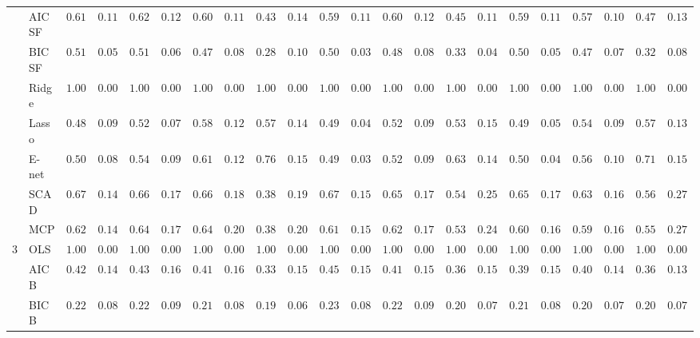 \begin{tabular}{ll|ll|llllll|llllll|llllll}
 & AIC SF  & $0.6183$ & $0.1143$ & $0.6217$ & $0.1250$ & $0.6067$ & $0.1197$ & $0.4367$ & $0.1494$ & $0.5917$ & $0.1145$ & $0.6067$ & $0.1265$ & $0.4500$ & $0.1173$ & $0.5983$ & $0.1138$ & $0.5700$ & $0.1064$ & $0.4700$ & $0.1327$ \\
 & BIC SF  & $0.5100$ & $0.0520$ & $0.5100$ & $0.0619$ & $0.4700$ & $0.0834$ & $0.2833$ & $0.1019$ & $0.5017$ & $0.0374$ & $0.4800$ & $0.0863$ & $0.3350$ & $0.0443$ & $0.5050$ & $0.0500$ & $0.4767$ & $0.0750$ & $0.3200$ & $0.0876$ \\
 & Ridge  & $1.0000$ & $0.0000$ & $1.0000$ & $0.0000$ & $1.0000$ & $0.0000$ & $1.0000$ & $0.0000$ & $1.0000$ & $0.0000$ & $1.0000$ & $0.0000$ & $1.0000$ & $0.0000$ & $1.0000$ & $0.0000$ & $1.0000$ & $0.0000$ & $1.0000$ & $0.0000$ \\
 & Lasso  & $0.4867$ & $0.0967$ & $0.5267$ & $0.0739$ & $0.5833$ & $0.1219$ & $0.5700$ & $0.1425$ & $0.4900$ & $0.0463$ & $0.5217$ & $0.0907$ & $0.5350$ & $0.1522$ & $0.4933$ & $0.0525$ & $0.5433$ & $0.0966$ & $0.5733$ & $0.1347$ \\
 & E-net  & $0.5017$ & $0.0837$ & $0.5467$ & $0.0920$ & $0.6183$ & $0.1238$ & $0.7600$ & $0.1577$ & $0.4983$ & $0.0374$ & $0.5267$ & $0.0939$ & $0.6383$ & $0.1480$ & $0.5000$ & $0.0474$ & $0.5600$ & $0.1099$ & $0.7100$ & $0.1528$ \\
 & SCAD  & $0.6783$ & $0.1484$ & $0.6617$ & $0.1732$ & $0.6667$ & $0.1880$ & $0.3800$ & $0.1955$ & $0.6717$ & $0.1507$ & $0.6583$ & $0.1747$ & $0.5417$ & $0.2577$ & $0.6567$ & $0.1722$ & $0.6350$ & $0.1653$ & $0.5633$ & $0.2770$ \\
 & MCP  & $0.6283$ & $0.1457$ & $0.6450$ & $0.1703$ & $0.6433$ & $0.2024$ & $0.3850$ & $0.2020$ & $0.6150$ & $0.1548$ & $0.6233$ & $0.1767$ & $0.5333$ & $0.2462$ & $0.6067$ & $0.1684$ & $0.5983$ & $0.1693$ & $0.5550$ & $0.2763$ \\\hline
3 & OLS  & $1.0000$ & $0.0000$ & $1.0000$ & $0.0000$ & $1.0000$ & $0.0000$ & $1.0000$ & $0.0000$ & $1.0000$ & $0.0000$ & $1.0000$ & $0.0000$ & $1.0000$ & $0.0000$ & $1.0000$ & $0.0000$ & $1.0000$ & $0.0000$ & $1.0000$ & $0.0000$ \\
 & AIC B  & $0.4233$ & $0.1449$ & $0.4333$ & $0.1692$ & $0.4100$ & $0.1648$ & $0.3367$ & $0.1589$ & $0.4500$ & $0.1562$ & $0.4133$ & $0.1598$ & $0.3633$ & $0.1560$ & $0.3900$ & $0.1539$ & $0.4033$ & $0.1444$ & $0.3600$ & $0.1355$ \\
 & BIC B  & $0.2200$ & $0.0816$ & $0.2233$ & $0.0954$ & $0.2150$ & $0.0896$ & $0.1983$ & $0.0699$ & $0.2367$ & $0.0860$ & $0.2217$ & $0.0919$ & $0.2017$ & $0.0760$ & $0.2117$ & $0.0882$ & $0.2050$ & $0.0744$ & $0.2000$ & $0.0749$ \\

\end{tabular}
